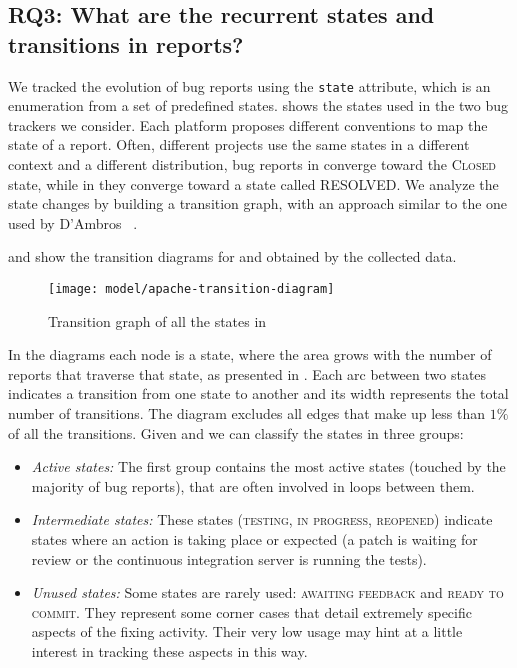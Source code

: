 
\subsection*{RQ3: What are the recurrent states and transitions in reports?} \label{sec:approach-states}

We tracked the evolution of bug reports using the \texttt{state} attribute, which is an enumeration from a set of predefined states.  shows the states used in the two bug trackers we consider. Each platform proposes different conventions to map the state of a report. Often, different projects use the same states in a different context and a different distribution, \eg bug reports in \jira converge toward the \textsc{Closed} state, while in \bzilla they converge toward a state called \textsc{RESOLVED}. We analyze the state changes by building a transition graph, with an approach similar to the one used by D'Ambros \etal~\cite{DAmb2007b}.

 and  show the transition diagrams for \jira and \bzilla obtained by the collected data.

\begin{figure*}[h!]
\centering
\texttt{[image: model/apache-transition-diagram]}
\caption{Transition graph of all the states in \jira}
\label{fig:apache_transitions}
\end{figure*}

In the diagrams each node is a state, where the area grows with the number of reports that traverse that state, as presented in . Each arc between two states indicates a transition from one state to another and its width represents the total number of transitions. The diagram excludes all edges that make up less than $1\%$ of all the transitions. Given  and  we can classify the states in three groups: 

\begin{itemize}[$\circ$]

\item {\it Active states:} The first group contains the most active states (\ie touched by the majority of bug reports), that are often involved in loops between them.

\item {\it Intermediate states:} These states (\eg \textsc{testing}, \textsc{in progress}, \textsc{reopened}) indicate states where an action is taking place or expected (\eg a patch is waiting for review or the continuous integration server is running the tests).

\item {\it Unused states:} Some states are rarely used: \textsc{awaiting feedback} and \textsc{ready to commit}. They represent some corner cases that detail extremely specific aspects of the fixing activity. Their very low usage may hint at a little interest in tracking these aspects in this way.

\end{itemize}

